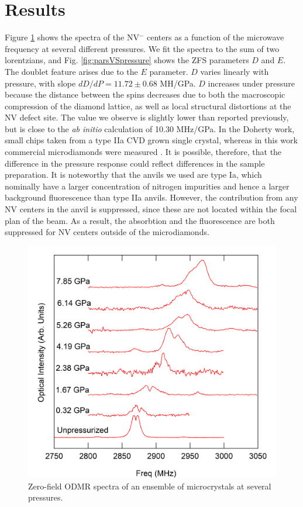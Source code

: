 \documentclass[%
 aip,
 sd,%
 amsmath,amssymb,
 reprint,%
 longbibliography
]{revtex4-1}
\begin{document}
\section{Results}

Figure \ref{fig:waterfall} shows the spectra of the NV$^-$ centers as a function of the microwave frequency at several different pressures.   We fit the spectra to the sum of two lorentzians, and Fig. \ref{fig:parsVSpressure} shows  the ZFS parameters $D$ and $E$.  The doublet feature arises due to the $E$ parameter.  $D$ varies linearly with pressure, with slope $dD/dP = 11.72 \pm 0.68$ MH/GPa. $D$ increases under pressure because the distance between the spins decreases  due to both the macroscopic compression of the diamond lattice, as well as local structural distortions at the NV defect site.\cite{NVpressureTheory}  The value we observe is slightly lower than reported previously, \cite{NVpressurePRL} but is close to the \textit{ab initio} calculation of 10.30 MHz/GPa.\cite{NVpressureTheory}  In the Doherty work, small chips taken from a type IIa CVD grown single crystal, whereas in this work commercial microdiamonds were measured . It is possible, therefore, that the difference in the pressure response could reflect differences in the sample preparation.  It is noteworthy that the anvils we used are type Ia, which nominally have a larger concentration of nitrogen impurities and hence a larger background fluorescence than type IIa anvils.  However, the contribution from any NV centers in the anvil is suppressed, since these are not located within the focal plan of the beam. As a result, the absorbtion and the fluorescence are both suppressed for NV centers outside of the microdiamonds.


\begin{figure}[!tb]
\includegraphics[width=\linewidth]{Waterfall3}%
\caption{\label{fig:waterfall} Zero-field ODMR spectra  of an ensemble of microcrystals at several pressures.}
\end{figure}
\end{document}
